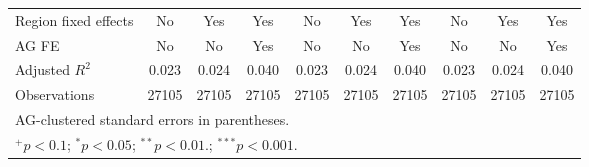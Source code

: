 \begin{table}[htbp]
\begin{tabular}{l*{9}{c}}
Region fixed effects&          No         &         Yes         &         Yes         &          No         &         Yes         &         Yes         &          No         &         Yes         &         Yes         \\
AG FE               &          No         &          No         &         Yes         &          No         &          No         &         Yes         &          No         &          No         &         Yes         \\
Adjusted $ R^{2} $  &       0.023         &       0.024         &       0.040         &       0.023         &       0.024         &       0.040         &       0.023         &       0.024         &       0.040         \\
Observations        &       27105         &       27105         &       27105         &       27105         &       27105         &       27105         &       27105         &       27105         &       27105         \\
\hline\hline
\multicolumn{10}{l}{\footnotesize AG-clustered standard errors in parentheses.}\\
\multicolumn{10}{l}{\footnotesize $^{+}p<0.1$; $^{*}p<0.05$; $^{**}p<0.01.$; $^{***}p<0.001.$ }\\
\end{tabular}
\end{table}
